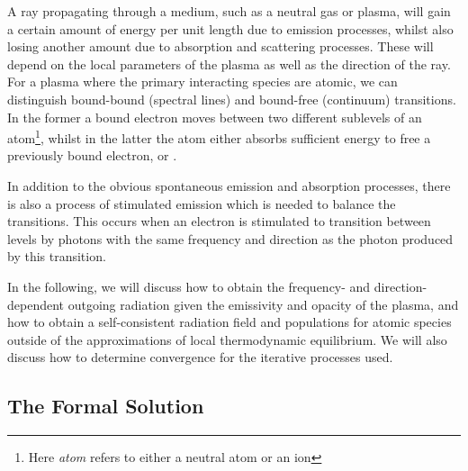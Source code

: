 A ray propagating through a medium, such as a neutral gas or plasma, will gain a certain amount of energy per unit length due to emission processes, whilst also losing another amount due to absorption and scattering processes. These will depend on the local parameters of the plasma as well as the direction of the ray. For a plasma where the primary interacting species are atomic, we can distinguish bound-bound (spectral lines) and bound-free (continuum) transitions. In the former a bound electron moves between two different sublevels of an atom\footnote{Here \emph{atom} refers to either a neutral atom or an ion}, whilst in the latter the atom either absorbs sufficient energy to free a previously bound electron, or .

In addition to the obvious spontaneous emission and absorption processes, there is also a process of stimulated emission which is needed to balance the transitions. This occurs when an electron is stimulated to transition between levels by photons with the same frequency and direction as the photon produced by this transition.

In the following, we will discuss how to obtain the frequency- and direction-dependent outgoing radiation given the emissivity and opacity of the plasma, and how to obtain a self-consistent radiation field and populations for atomic species outside of the approximations of local thermodynamic equilibrium.
We will also discuss how to determine convergence for the iterative processes used.

\subsection{The Formal Solution}

